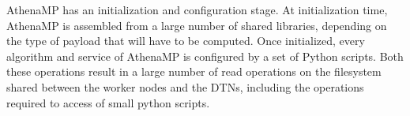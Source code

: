 AthenaMP has an initialization and configuration stage. At initialization time,
AthenaMP is assembled from a large number of shared libraries, depending on the
type of payload that will have to be computed. Once initialized, every algorithm
and service of AthenaMP is configured by a set of Python scripts. Both these
operations result in a large number of read operations on the filesystem shared
between the worker nodes and the DTNs, including the operations required to
access of small python scripts.






